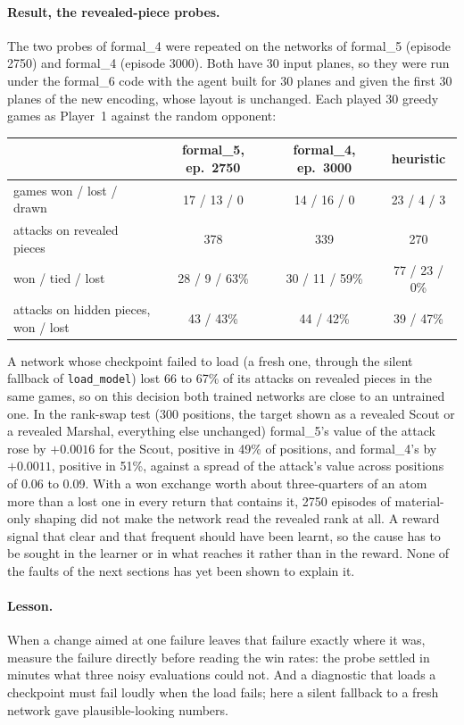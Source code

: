 \paragraph{Result, the revealed-piece probes.} The two probes of formal\_4 were repeated on the
networks of formal\_5 (episode 2750) and formal\_4 (episode 3000). Both have 30 input planes, so
they were run under the formal\_6 code with the agent built for 30 planes and given the first 30
planes of the new encoding, whose layout is unchanged. Each played 30 greedy games as Player~1
against the random opponent:
\begin{center}
\begin{tabular}{lccc}
\toprule
 & formal\_5, ep.\ 2750 & formal\_4, ep.\ 3000 & heuristic \\
\midrule
games won / lost / drawn               & 17 / 13 / 0 & 14 / 16 / 0 & 23 / 4 / 3 \\
attacks on revealed pieces             & 378         & 339         & 270 \\
\quad won / tied / lost                & 28 / 9 / 63\% & 30 / 11 / 59\% & 77 / 23 / 0\% \\
attacks on hidden pieces, won / lost   & 43 / 43\%   & 44 / 42\%   & 39 / 47\% \\
\bottomrule
\end{tabular}
\end{center}
A network whose checkpoint failed to load (a fresh one, through the silent fallback of
\texttt{load\_model}) lost 66 to 67\% of its attacks on revealed pieces in the same games, so on
this decision both trained networks are close to an untrained one. In the rank-swap test (300
positions, the target shown as a revealed Scout or a revealed Marshal, everything else unchanged)
formal\_5's value of the attack rose by $+0.0016$ for the Scout, positive in 49\% of positions,
and formal\_4's by $+0.0011$, positive in 51\%, against a spread of the attack's value across
positions of 0.06 to 0.09. With a won exchange worth about three-quarters of an atom more than a
lost one in every return that contains it, 2750 episodes of material-only shaping did not make
the network read the revealed rank at all. A reward signal that clear and that frequent should
have been learnt, so the cause has to be sought in the learner or in what reaches it rather than
in the reward. None of the faults of the next sections has yet been shown to explain it.

\paragraph{Lesson.} When a change aimed at one failure leaves that failure exactly where it was,
measure the failure directly before reading the win rates: the probe settled in minutes what
three noisy evaluations could not. And a diagnostic that loads a checkpoint must fail loudly when
the load fails; here a silent fallback to a fresh network gave plausible-looking numbers.

